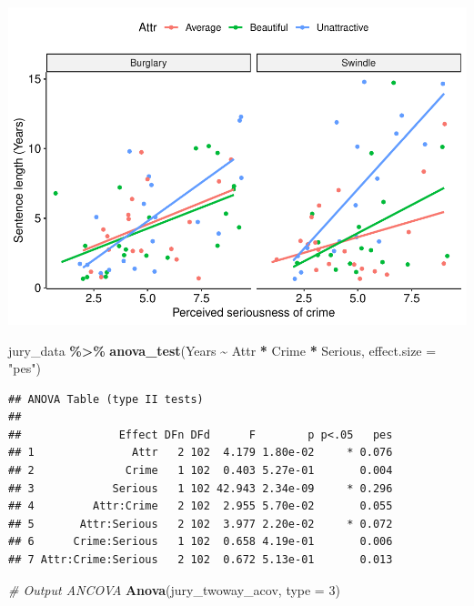\documentclass[
]{book}
\newenvironment{Shaded}{\begin{snugshade}}{\end{snugshade}}
\newcommand{\AttributeTok}[1]{\textcolor[rgb]{0.13,0.29,0.53}{#1}}
\newcommand{\CommentTok}[1]{\textcolor[rgb]{0.56,0.35,0.01}{\textit{#1}}}
\newcommand{\DecValTok}[1]{\textcolor[rgb]{0.00,0.00,0.81}{#1}}
\newcommand{\FunctionTok}[1]{\textcolor[rgb]{0.13,0.29,0.53}{\textbf{#1}}}
\newcommand{\NormalTok}[1]{#1}
\newcommand{\SpecialCharTok}[1]{\textcolor[rgb]{0.81,0.36,0.00}{\textbf{#1}}}
\newcommand{\StringTok}[1]{\textcolor[rgb]{0.31,0.60,0.02}{#1}}
\begin{document}
\includegraphics{_main_files/figure-latex/unnamed-chunk-269-1.pdf}

\begin{Shaded}
\begin{Highlighting}[]
\NormalTok{jury\_data }\SpecialCharTok{\%\textgreater{}\%}
  \FunctionTok{anova\_test}\NormalTok{(Years }\SpecialCharTok{\textasciitilde{}}\NormalTok{ Attr }\SpecialCharTok{*}\NormalTok{ Crime }\SpecialCharTok{*}\NormalTok{ Serious, }\AttributeTok{effect.size =} \StringTok{"pes"}\NormalTok{)}
\end{Highlighting}
\end{Shaded}

\begin{verbatim}
## ANOVA Table (type II tests)
## 
##               Effect DFn DFd      F        p p<.05   pes
## 1               Attr   2 102  4.179 1.80e-02     * 0.076
## 2              Crime   1 102  0.403 5.27e-01       0.004
## 3            Serious   1 102 42.943 2.34e-09     * 0.296
## 4         Attr:Crime   2 102  2.955 5.70e-02       0.055
## 5       Attr:Serious   2 102  3.977 2.20e-02     * 0.072
## 6      Crime:Serious   1 102  0.658 4.19e-01       0.006
## 7 Attr:Crime:Serious   2 102  0.672 5.13e-01       0.013
\end{verbatim}

\begin{Shaded}
\begin{Highlighting}[]
\CommentTok{\# Output ANCOVA}
\FunctionTok{Anova}\NormalTok{(jury\_twoway\_acov, }\AttributeTok{type =} \DecValTok{3}\NormalTok{)}
\end{Highlighting}
\end{Shaded}
\end{document}
